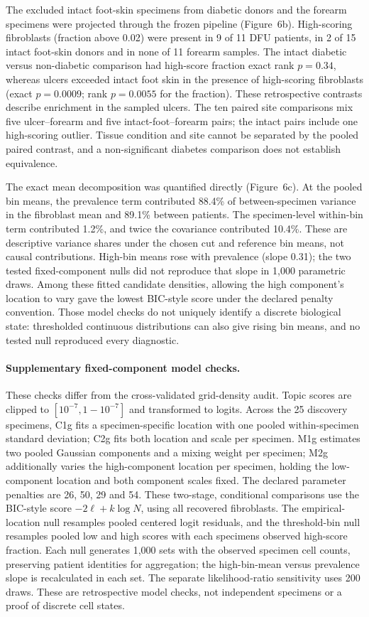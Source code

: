\documentclass[10pt,a4paper]{article}
\begin{document}
The excluded intact foot-skin specimens from diabetic donors and the forearm specimens were projected through the frozen pipeline (Figure~6b). High-scoring fibroblasts (fraction above 0.02) were present in 9 of 11 DFU patients, in 2 of 15 intact foot-skin donors and in none of 11 forearm samples. The intact diabetic versus non-diabetic comparison had high-score fraction exact rank $p=0.34$, whereas ulcers exceeded intact foot skin in the presence of high-scoring fibroblasts (exact $p=0.0009$; rank $p=0.0055$ for the fraction). These retrospective contrasts describe enrichment in the sampled ulcers. The ten paired site comparisons mix five ulcer--forearm and five intact-foot--forearm pairs; the intact pairs include one high-scoring outlier. Tissue condition and site cannot be separated by the pooled paired contrast, and a non-significant diabetes comparison does not establish equivalence.

The exact mean decomposition was quantified directly (Figure~6c). At the pooled bin means, the prevalence term contributed 88.4\% of between-specimen variance in the fibroblast mean and 89.1\% between patients. The specimen-level within-bin term contributed 1.2\%, and twice the covariance contributed 10.4\%. These are descriptive variance shares under the chosen cut and reference bin means, not causal contributions. High-bin means rose with prevalence (slope 0.31); the two tested fixed-component nulls did not reproduce that slope in 1,000 parametric draws. Among these fitted candidate densities, allowing the high component's location to vary gave the lowest BIC-style score under the declared penalty convention. Those model checks do not uniquely identify a discrete biological state: thresholded continuous distributions can also give rising bin means, and no tested null reproduced every diagnostic.

\paragraph{Supplementary fixed-component model checks.} These checks differ from the cross-validated grid-density audit. Topic scores are clipped to $[10^{-7},1-10^{-7}]$ and transformed to logits. Across the 25 discovery specimens, C1g fits a specimen-specific location with one pooled within-specimen standard deviation; C2g fits both location and scale per specimen. M1g estimates two pooled Gaussian components and a mixing weight per specimen; M2g additionally varies the high-component location per specimen, holding the low-component location and both component scales fixed. The declared parameter penalties are 26, 50, 29 and 54. These two-stage, conditional comparisons use the BIC-style score $-2\ell+k\log N$, using all recovered fibroblasts. The empirical-location null resamples pooled centered logit residuals, and the threshold-bin null resamples pooled low and high scores with each specimen\textquotesingle{}s observed high-score fraction. Each null generates 1,000 sets with the observed specimen cell counts, preserving patient identities for aggregation; the high-bin-mean versus prevalence slope is recalculated in each set. The separate likelihood-ratio sensitivity uses 200 draws. These are retrospective model checks, not independent specimens or a proof of discrete cell states.
\end{document}
